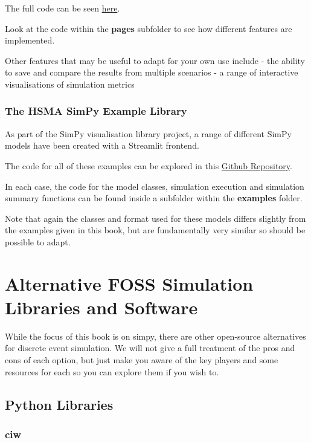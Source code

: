 \documentclass[
  letterpaper,
  DIV=11,
  numbers=noendperiod]{scrreprt}
\begin{document}
The full code can be seen
\href{https://github.com/hsma-programme/Teaching_DES_Concepts_Streamlit}{here}.

Look at the code within the \textbf{pages} subfolder to see how
different features are implemented.

Other features that may be useful to adapt for your own use include -
the ability to save and compare the results from multiple scenarios - a
range of interactive visualisations of simulation metrics

\subsection{The HSMA SimPy Example
Library}\label{the-hsma-simpy-example-library}

As part of the SimPy visualisation library project, a range of different
SimPy models have been created with a Streamlit frontend.

The code for all of these examples can be explored in this
\href{https://github.com/Bergam0t/simpy_visualisation}{Github
Repository}.

In each case, the code for the model classes, simulation execution and
simulation summary functions can be found inside a subfolder within the
\textbf{examples} folder.

Note that again the classes and format used for these models differs
slightly from the examples given in this book, but are fundamentally
very similar so should be possible to adapt.


\chapter{Alternative FOSS Simulation Libraries and
Software}\label{alternative-foss-simulation-libraries-and-software}

While the focus of this book is on simpy, there are other open-source
alternatives for discrete event simulation. We will not give a full
treatment of the pros and cons of each option, but just make you aware
of the key players and some resources for each so you can explore them
if you wish to.

\section{Python Libraries}\label{python-libraries}

\subsection{ciw}\label{ciw}
\end{document}
